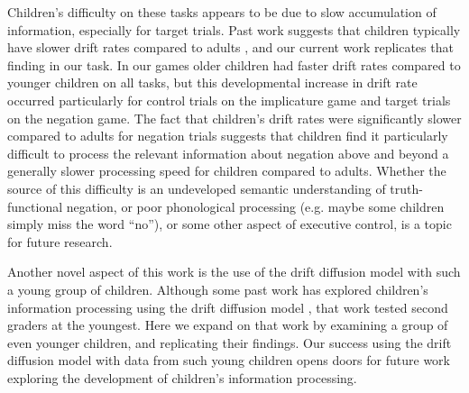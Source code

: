 \documentclass[10pt,letterpaper]{article}
\begin{document}
Children's difficulty on these tasks appears to be due to slow accumulation of information, especially for target trials.  Past work suggests that children typically have slower drift rates compared to adults \cite{ratcliff2012}, and our current work replicates that finding in our task.  In our games older children had faster drift rates compared to younger children on all tasks, but this developmental increase in drift rate occurred particularly for control trials on the implicature game and target trials on the negation game.  The fact that children's drift rates were significantly slower compared to adults for negation trials suggests that children find it particularly difficult to process the relevant information about negation above and beyond a generally slower processing speed for children compared to adults.  Whether the source of this difficulty is an undeveloped semantic understanding of truth-functional negation, or poor phonological processing (e.g. maybe some children simply miss the word ``no''), or some other aspect of executive control, is a topic for future research.  

Another novel aspect of this work is the use of the drift diffusion model with such a young group of children.  Although some past work has explored children's information processing using the drift diffusion model \cite{ratcliff2012}, that work tested second graders at the youngest.  Here we expand on that work by examining a group of even younger children, and replicating their findings.  Our success using the drift diffusion model with data from such young children opens doors for future work exploring the development of children's information processing.

%



\setlength{\bibleftmargin}{.125in}
\setlength{\bibindent}{-\bibleftmargin}


\end{document}
